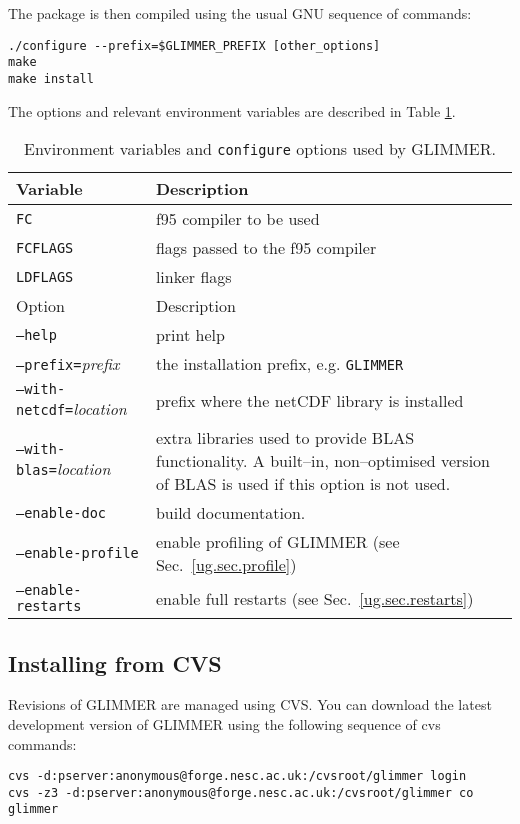 The package is then compiled using the usual GNU sequence of commands:
\begin{verbatim}
./configure --prefix=$GLIMMER_PREFIX [other_options]
make
make install
\end{verbatim}
%
The options and relevant environment variables are described in Table \ref{ug.tab.env}. 
%
\begin{table}[htbp]
  \centering
  \begin{tabular}{|l|p{8cm}|}
    \hline
    Variable & Description \\
    \hline
    \texttt{FC} & f95 compiler to be used \\
    \texttt{FCFLAGS} & flags passed to the f95 compiler \\
    \texttt{LDFLAGS} & linker flags\\
    \hline
    Option  & Description \\
    \hline
    \texttt{--help} & print help \\
    \texttt{--prefix=}{\it prefix} & the installation prefix, e.g. \texttt{GLIMMER} \\
    \texttt{--with-netcdf=}{\it location} & prefix where the netCDF library is installed \\
    \texttt{--with-blas=}{\it location} & extra libraries used to provide BLAS functionality. A built--in, non--optimised version of BLAS is used if this option is not used. \\
    \texttt{--enable-doc} & build documentation.\\
    \texttt{--enable-profile} & enable profiling of GLIMMER (see Sec.~\ref{ug.sec.profile})\\
    \texttt{--enable-restarts} & enable full restarts (see Sec.~\ref{ug.sec.restarts})\\
    \hline
  \end{tabular}
  \caption{Environment variables and \texttt{configure} options used by GLIMMER.}
  \label{ug.tab.env}
\end{table}
%
\subsection{Installing from CVS}
Revisions of GLIMMER are managed using CVS. You can download the latest development version of GLIMMER using the following sequence of cvs commands:
\begin{verbatim}
cvs -d:pserver:anonymous@forge.nesc.ac.uk:/cvsroot/glimmer login
cvs -z3 -d:pserver:anonymous@forge.nesc.ac.uk:/cvsroot/glimmer co glimmer
\end{verbatim}

